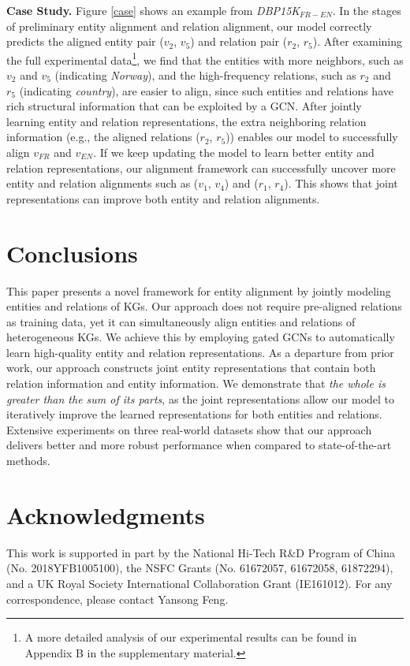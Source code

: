 \documentclass[11pt,a4paper]{article}
\newcommand\cparagraph[1]{\vspace{1mm}\noindent\textbf{#1.}}
\begin{document}
\cparagraph{Case Study}
Figure \ref{case} shows an example from \textit{DBP15K}$_{FR-EN}$. In the stages of preliminary entity alignment and relation alignment,
our model correctly predicts the aligned entity pair ($v_2$, $v_5$) and relation pair ($r_2$, $r_5$). After examining the full experimental
data\footnote{A more detailed analysis of our experimental results can be found in Appendix B in the supplementary material.},
we find that the entities with more neighbors, such as $v_2$ and $v_5$ (indicating \emph{Norway}), and the high-frequency relations, such
as $r_2$ and $r_5$ (indicating \emph{country}), are easier to align, since such entities and relations have rich structural information
that can be exploited by a GCN. After jointly learning entity and relation representations, the extra neighboring relation information (e.g., the aligned relations ($r_2$, $r_5$)) enables our model to successfully align $v_{FR}$ and $v_{EN}$. If we keep updating the model to learn better entity and relation representations, our alignment framework can successfully uncover
more entity and relation alignments such as ($v_1$, $v_4$) and ($r_1$, $r_4$). This shows that joint representations can improve both entity and relation alignments.




\section{Conclusions}

This paper presents a novel framework for entity alignment by jointly modeling entities and relations of KGs.
Our approach does not require pre-aligned relations as training data, yet it can simultaneously align entities and relations
of heterogeneous KGs. We achieve this by employing gated GCNs to automatically learn high-quality entity and relation
representations. As a departure from prior work, our approach
constructs joint entity representations that contain both relation information and entity information. We demonstrate that \textit{the
	whole is greater than the sum of its parts}, as the joint representations allow our model to iteratively improve the
learned representations for both entities and relations. Extensive experiments on three real-world datasets show
that our approach delivers better and more robust performance when compared to state-of-the-art methods.



\section*{Acknowledgments}
This work is supported in part by the National Hi-Tech R\&D Program of China (No. 2018YFB1005100), the NSFC Grants (No. 61672057, 61672058, 61872294), and a UK Royal Society International Collaboration Grant (IE161012). For any correspondence, please contact Yansong Feng.
\end{document}
